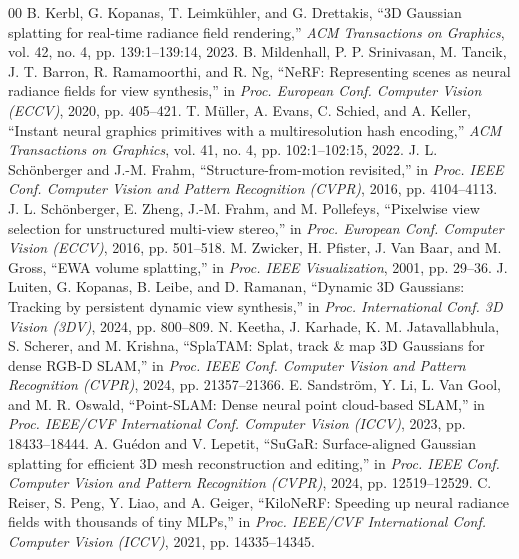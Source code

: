 \documentclass[conference]{IEEEtran}
\begin{document}
\begin{thebibliography}{00}
 B. Kerbl, G. Kopanas, T. Leimk{\"u}hler, and G. Drettakis, ``3D Gaussian splatting for real-time radiance field rendering,'' \textit{ACM Transactions on Graphics}, vol. 42, no. 4, pp. 139:1--139:14, 2023.
 B. Mildenhall, P. P. Srinivasan, M. Tancik, J. T. Barron, R. Ramamoorthi, and R. Ng, ``NeRF: Representing scenes as neural radiance fields for view synthesis,'' in \textit{Proc. European Conf. Computer Vision (ECCV)}, 2020, pp. 405--421.
 T. M{\"u}ller, A. Evans, C. Schied, and A. Keller, ``Instant neural graphics primitives with a multiresolution hash encoding,'' \textit{ACM Transactions on Graphics}, vol. 41, no. 4, pp. 102:1--102:15, 2022.
 J. L. Sch{\"o}nberger and J.-M. Frahm, ``Structure-from-motion revisited,'' in \textit{Proc. IEEE Conf. Computer Vision and Pattern Recognition (CVPR)}, 2016, pp. 4104--4113.
 J. L. Sch{\"o}nberger, E. Zheng, J.-M. Frahm, and M. Pollefeys, ``Pixelwise view selection for unstructured multi-view stereo,'' in \textit{Proc. European Conf. Computer Vision (ECCV)}, 2016, pp. 501--518.
 M. Zwicker, H. Pfister, J. Van Baar, and M. Gross, ``EWA volume splatting,'' in \textit{Proc. IEEE Visualization}, 2001, pp. 29--36.
 J. Luiten, G. Kopanas, B. Leibe, and D. Ramanan, ``Dynamic 3D Gaussians: Tracking by persistent dynamic view synthesis,'' in \textit{Proc. International Conf. 3D Vision (3DV)}, 2024, pp. 800--809.
 N. Keetha, J. Karhade, K. M. Jatavallabhula, S. Scherer, and M. Krishna, ``SplaTAM: Splat, track \& map 3D Gaussians for dense RGB-D SLAM,'' in \textit{Proc. IEEE Conf. Computer Vision and Pattern Recognition (CVPR)}, 2024, pp. 21357--21366.
 E. Sandstr{\"o}m, Y. Li, L. Van Gool, and M. R. Oswald, ``Point-SLAM: Dense neural point cloud-based SLAM,'' in \textit{Proc. IEEE/CVF International Conf. Computer Vision (ICCV)}, 2023, pp. 18433--18444.
 A. Gu{\'e}don and V. Lepetit, ``SuGaR: Surface-aligned Gaussian splatting for efficient 3D mesh reconstruction and editing,'' in \textit{Proc. IEEE Conf. Computer Vision and Pattern Recognition (CVPR)}, 2024, pp. 12519--12529.
 C. Reiser, S. Peng, Y. Liao, and A. Geiger, ``KiloNeRF: Speeding up neural radiance fields with thousands of tiny MLPs,'' in \textit{Proc. IEEE/CVF International Conf. Computer Vision (ICCV)}, 2021, pp. 14335--14345.

\end{thebibliography}
\end{document}
